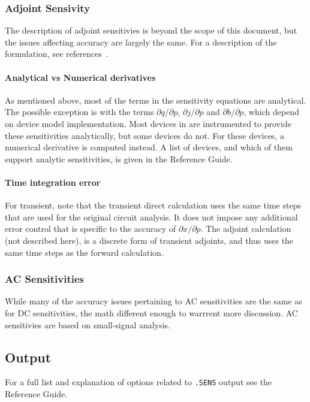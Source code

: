 \subsubsection{Adjoint Sensivity}
The description of adjoint sensitivies is beyond the scope of this document, but the issues affecting accuracy are largely the same.  For a description of the formulation, see references~\cite{KeiterGradEnhnacedPCE2016,KeiterUQ2019}.

\paragraph{Analytical vs Numerical derivatives}
As mentioned above, most of the terms in the sensitivity equations are analytical.  
The possible exception is with the 
terms $\partial q/\partial p$, $\partial j/\partial p$ and $\partial b/\partial p$, which 
depend on device model implementation.  Most devices in \Xyce{} are instrumented to provide 
these sensitivities analytically, but some devices do not.  For these devices, a numerical derivative is computed instead.
A list of \Xyce{}
devices, and which of them support analytic sensitivities, is given in
the \Xyce{} Reference Guide\ReferenceGuide{}.

\paragraph{Time integration error}
For transient, note that the transient direct calculation uses the
same time steps that are used for the original circuit analysis.  It
does not impose any additional error control that is specific to the
accuracy of $\partial x/\partial p$.  The adjoint calculation 
(not described here), is a discrete form of transient adjoints, and thus 
uses the same time steps as the forward calculation.

\subsubsection{AC Sensitivities}

While many of the accuracy issues pertaining to AC sensitivities are the same as for DC sensitivities, 
the math different enough to warrrent more discussion.  AC sensitivies are based on small-signal analysis.


\clearpage
\subsection{Output}
\label{SENS_Output}
For a full list and explanation of options related to \texttt{.SENS}
output see the \Xyce{} Reference Guide\ReferenceGuide{}.

